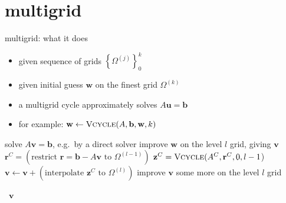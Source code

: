 \documentclass[hide notes,intlimits,usenames,dvipsnames]{beamer}
\newcommand{\bb}{\mathbf{b}}
\newcommand{\br}{\mathbf{r}}
\newcommand{\bu}{\mathbf{u}}
\newcommand{\bv}{\mathbf{v}}
\newcommand{\bw}{\mathbf{w}}
\newcommand{\bz}{\mathbf{z}}
\begin{document}
\section{multigrid}

\begin{frame}{multigrid: what it does}

\small
\begin{itemize}
\item given sequence of grids $\left\{\Omega^{(j)}\right\}_0^k$ \qquad \begin{tikzpicture}[scale=0.8,baseline]

\end{tikzpicture}
\item given initial guess $\bw$ on the finest grid $\Omega^{(k)}$
\item a multigrid cycle approximately solves $A \bu = \bb$
\item for example: $\bw \gets \text{\textsc{Vcycle}}(A,\bb,\bw,k)$
\end{itemize}

\begin{minipage}[t]{75mm}
\begin{algorithmic}
\footnotesize
\Function{Vcycle}{$A,\bb,\bw,l$}
        \State solve $A \bv = \bb$, e.g.~by a direct solver
    \Else
        \State improve $\bw$ on the level $l$ grid, giving $\bv$
        \State $\br^C = \left(\text{restrict } \br = \bb - A \bv \text{ to } \Omega^{(l-1)}\right)$
        \State $\bz^C = \text{\textsc{Vcycle}}(A^C,\br^C,0,l-1$)
        \State $\bv \gets \bv + \left(\text{interpolate } \bz^C \text{ to } \Omega^{(l)}\right)$
        \State improve $\bv$ some more on the level $l$ grid
    \EndIf

    \noindent \quad\, \Return $\bv$
\EndFunction
\end{algorithmic}
\end{minipage}
\quad
\begin{minipage}[t]{25mm}
\vspace{0mm}


\end{minipage}
\end{frame}
\end{document}

